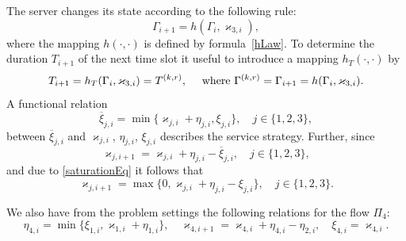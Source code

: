 \documentclass[runningheads,a4paper]{llncs}
\begin{document}
The server changes its state according to the following rule:
\begin{equation}
\Gamma_{i+1}=h(\Gamma_i,\varkappa_{3,i}),
\label{gammaFunc}
\end{equation}
where the mapping $h(\cdot,\cdot)$ is defined by formula~\eqref{hLaw}.
To determine the duration $T_{i+1}$ of the next time slot it useful to introduce a mapping
$h_T(\cdot,\cdot)$ by
\begin{equation*}
T_{i+1}=h_T(\Gamma_i,\varkappa_{3,i})= T^{(k,r)},\quad  \text{ where $ \Gamma^{(k,r)}=\Gamma_{i+1}=h(\Gamma_i,\varkappa_{3,i})$.}
\end{equation*}
A functional relation
\begin{equation}
\overline{\xi}_{j,i}=\min\{\varkappa_{j,i}+\eta_{j,i},\xi_{j,i}\}, \quad j\in \{1,2,3\},
\label{saturationEq}
\end{equation}
between $\overline{\xi}_{j,i}$ and $\varkappa_{j,i}$, $\eta_{j,i}$, $\xi_{j,i}$ describes the
service strategy. Further, since
\begin{equation*}
\varkappa_{j,i+1}=\varkappa_{j,i}+\eta_{j,i}-\overline{\xi}_{j,i}, \quad  j\in \{1,2,3\},
\end{equation*}
and due to \eqref{saturationEq} it follows that 
\begin{equation}
\varkappa_{j,i+1}=\max\{{0,\varkappa_{j,i}+\eta_{j,i}-\xi_{j,i}}\}, \quad j\in \{1,2,3\}.
\label{queuesFunc}
\end{equation}

We also have from  the  problem settings the following relations for the flow $\Pi_4$:
\begin{equation}
\eta_{4,i} = \min\{\xi_{1,i}, \varkappa_{1,i}+\eta_{1,i}\}, \quad \varkappa_{4,i+1}=\varkappa_{4,i}+\eta_{4,i}-\eta_{2,i}, \quad \xi_{4,i} = \varkappa_{4,i}.
\label{FourthFunc}
\end{equation}
\end{document}
